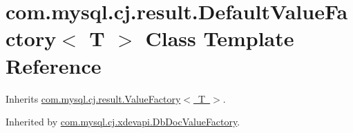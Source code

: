 \hypertarget{classcom_1_1mysql_1_1cj_1_1result_1_1_default_value_factory}{}\section{com.\+mysql.\+cj.\+result.\+Default\+Value\+Factory$<$ T $>$ Class Template Reference}
\label{classcom_1_1mysql_1_1cj_1_1result_1_1_default_value_factory}


Inherits \mbox{\hyperlink{interfacecom_1_1mysql_1_1cj_1_1result_1_1_value_factory}{com.\+mysql.\+cj.\+result.\+Value\+Factory$<$ T $>$}}.



Inherited by \mbox{\hyperlink{classcom_1_1mysql_1_1cj_1_1xdevapi_1_1_db_doc_value_factory}{com.\+mysql.\+cj.\+xdevapi.\+Db\+Doc\+Value\+Factory}}.

